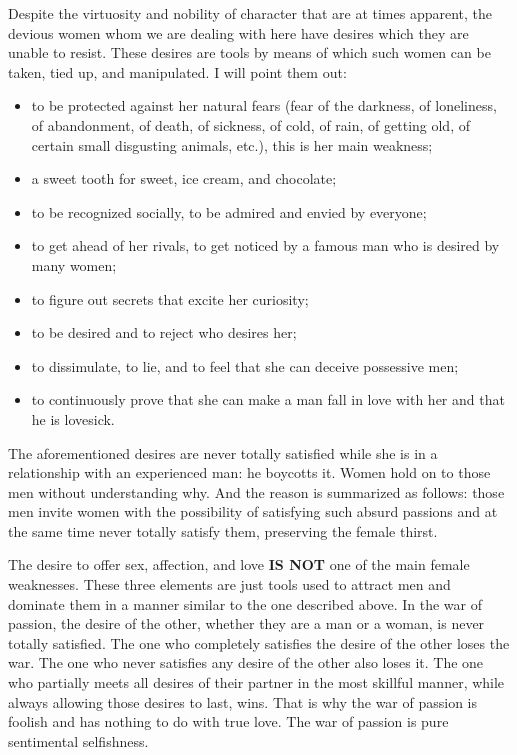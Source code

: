 \par Despite the virtuosity and nobility of character that are at times apparent, the devious women whom we are dealing with here have desires which they are unable to resist. These desires are tools by means of which such women can be taken, tied up, and manipulated. I will point them out:

\begin{itemize}
	\item to be protected against her natural fears (fear of the darkness, of loneliness, of abandonment, of death, of sickness, of cold, of rain, of getting old, of certain small disgusting animals, etc.), this is her main weakness;
	\item a sweet tooth for sweet, ice cream, and chocolate;
	\item to be recognized socially, to be admired and envied by everyone;
	\item to get ahead of her rivals, to get noticed by a famous man who is desired by many women;
	\item to figure out secrets that excite her curiosity;
	\item to be desired and to reject who desires her;
	\item to dissimulate, to lie, and to feel that she can deceive possessive men;
	\item to continuously prove that she can make a man fall in love with her and that he is lovesick.
\end{itemize}

\par The aforementioned desires are never totally satisfied while she is in a relationship with an experienced man: he boycotts it. Women hold on to those men without understanding why. And the reason is summarized as follows: those men invite women with the possibility of satisfying such absurd passions and at the same time never totally satisfy them, preserving the female thirst.

\par The desire to offer sex, affection, and love \textbf{IS NOT} one of the main female weaknesses. These three elements are just tools used to attract men and dominate them in a manner similar to the one described above. In the war of passion, the desire of the other, whether they are a man or a woman, is never totally satisfied. The one who completely satisfies the desire of the other loses the war. The one who never satisfies any desire of the other also loses it. The one who partially meets all desires of their partner in the most skillful manner, while always allowing those desires to last, wins. That is why the war of passion is foolish and has nothing to do with true love. The war of passion is pure sentimental selfishness.

